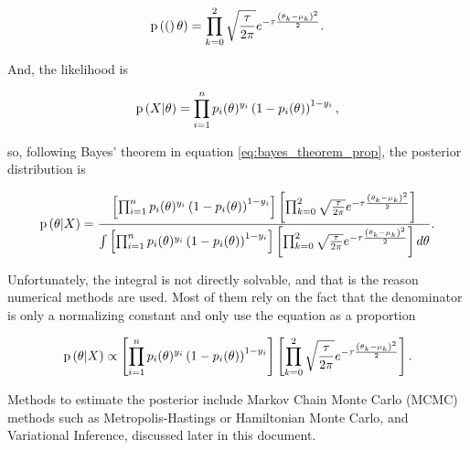 $$
  \mathrm{p}\left( ( \right)\theta) = \prod_{k = 0}^2 \sqrt{\frac{\tau}{2 \pi}} e^{- \tau \frac{\left( \theta_k - \mu_k \right)^2}{2}}.
$$

And, the likelihood is

$$
  \mathrm{p}\left( X | \theta \right) = \prod_{i = 1}^n  p_i(\theta)^{y_i}\left(1 - p_i(\theta) \right)^{1 - y_i},
$$

so, following Bayes' theorem in equation \ref{eq:bayes_theorem_prop}, the posterior distribution is

$$
  \mathrm{p}\left( \theta | X \right) =
    \frac
    {
      \left[ \prod_{i = 1}^n  p_i(\theta)^{y_i}\left(1 - p_i(\theta) \right)^{1 - y_i} \right]
      \left[ \prod_{k = 0}^2 \sqrt{\frac{\tau}{2 \pi}} e^{- \tau \frac{\left( \theta_k - \mu_k \right)^2}{2}} \right]
    }{
      \int \left[ \prod_{i = 1}^n  p_i(\theta)^{y_i}\left(1 - p_i(\theta) \right)^{1 - y_i} \right]
      \left[ \prod_{k = 0}^2 \sqrt{\frac{\tau}{2 \pi}} e^{- \tau \frac{\left( \theta_k - \mu_k \right)^2}{2}} \right] d\theta
    }.
$$

Unfortunately, the integral is not directly solvable, and that is the reason numerical methods are used. Most of them rely on the fact that the denominator is only a normalizing constant and only use the equation as a proportion

$$
  \mathrm{p}\left( \theta | X \right) \propto
  \left[ \prod_{i = 1}^n  p_i(\theta)^{y_i}\left(1 - p_i(\theta) \right)^{1 - y_i} \right]
  \left[ \prod_{k = 0}^2 \sqrt{\frac{\tau}{2 \pi}} e^{- \tau \frac{\left( \theta_k - \mu_k \right)^2}{2}} \right].
$$

Methods to estimate the posterior include Markov Chain Monte Carlo (MCMC) methods such as Metropolis-Hastings or Hamiltonian Monte Carlo, and Variational Inference, discussed later in this document.


